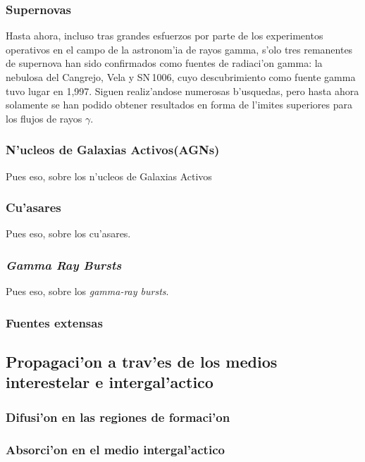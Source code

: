 \subsubsection{Supernovas}
%
Hasta ahora, incluso tras grandes esfuerzos por parte de los
experimentos operativos en el campo de la astronom'ia de rayos gamma,
s'olo tres remanentes de supernova han sido confirmados como fuentes
de radiaci'on gamma: la nebulosa del Cangrejo, Vela y SN\,1006, cuyo
descubrimiento como fuente gamma tuvo lugar en 1,997. Siguen
realiz'andose numerosas b'usquedas, pero hasta ahora solamente se han
podido obtener resultados en forma de l'imites superiores para los
flujos de rayos $\gamma$.

\subsubsection{N'ucleos de Galaxias Activos(AGNs)}
%
Pues eso, sobre los n'ucleos de Galaxias Activos

\subsubsection{Cu'asares}
%
Pues eso, sobre los cu'asares.

\subsubsection{\emph{Gamma Ray Bursts}}
%
Pues eso, sobre los \emph{gamma-ray bursts}.

\subsubsection{Fuentes extensas}

\subsection{Propagaci'on a trav'es de los medios 
interestelar e intergal'actico}

\subsubsection{Difusi'on en las regiones de formaci'on}

\subsubsection{Absorci'on en el medio intergal'actico}

